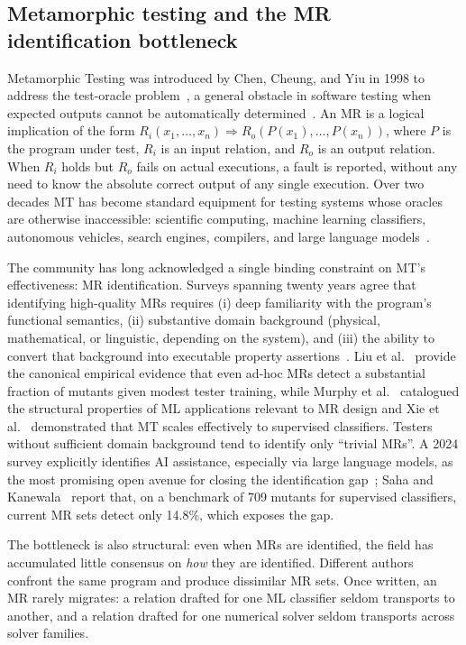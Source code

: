 \documentclass[manuscript]{acmart}
\begin{document}
\subsection{Metamorphic testing and the MR identification bottleneck}

Metamorphic Testing was introduced by Chen, Cheung, and Yiu in 1998 to address the test-oracle problem~\cite{Chen1998}, a general obstacle in software testing when expected outputs cannot be automatically determined~\cite{Barr2015OracleProblem}. An MR is a logical implication of the form $R_i(x_1,\dots,x_n) \Rightarrow R_o(P(x_1),\dots,P(x_n))$, where $P$ is the program under test, $R_i$ is an input relation, and $R_o$ is an output relation. When $R_i$ holds but $R_o$ fails on actual executions, a fault is reported, without any need to know the absolute correct output of any single execution. Over two decades MT has become standard equipment for testing systems whose oracles are otherwise inaccessible: scientific computing, machine learning classifiers, autonomous vehicles, search engines, compilers, and large language models~\cite{Segura2016, LiTOSEM2025}.

The community has long acknowledged a single binding constraint on MT's effectiveness: MR identification. Surveys spanning twenty years agree that identifying high-quality MRs requires (i) deep familiarity with the program's functional semantics, (ii) substantive domain background (physical, mathematical, or linguistic, depending on the system), and (iii) the ability to convert that background into executable property assertions~\cite{Segura2016, LiTOSEM2025}. Liu et al.~\cite{Liu2014MTEffectiveness} provide the canonical empirical evidence that even ad-hoc MRs detect a substantial fraction of mutants given modest tester training, while Murphy et al.~\cite{Murphy2008} catalogued the structural properties of ML applications relevant to MR design and Xie et al.~\cite{Xie2011} demonstrated that MT scales effectively to supervised classifiers. Testers without sufficient domain background tend to identify only ``trivial MRs''. A 2024 survey explicitly identifies AI assistance, especially via large language models, as the most promising open avenue for closing the identification gap~\cite{LiTOSEM2025}; Saha and Kanewala~\cite{Saha2019SupervisedMR} report that, on a benchmark of 709 mutants for supervised classifiers, current MR sets detect only 14.8\%, which exposes the gap.

The bottleneck is also structural: even when MRs are identified, the field has accumulated little consensus on \emph{how} they are identified. Different authors confront the same program and produce dissimilar MR sets. Once written, an MR rarely migrates: a relation drafted for one ML classifier seldom transports to another, and a relation drafted for one numerical solver seldom transports across solver families.
\end{document}
